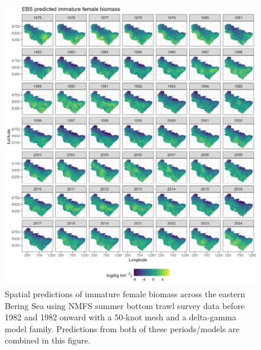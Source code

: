 \documentclass[
]{article}
\begin{document}
\begin{figure}

{\centering \includegraphics[width=1\linewidth,height=1\textheight]{../BAIRDI/Figures/EBS_imfem_spatbio} 

}

\caption{Spatial predictions of immature female biomass across the eastern Bering Sea using NMFS summer bottom trawl survey data before 1982 and 1982 onward with a 50-knot mesh and a delta-gamma model family. Predictions from both of these periods/models are combined in this figure.}\label{fig:spatpred-bio-50-imfem}
\end{figure}
\end{document}
